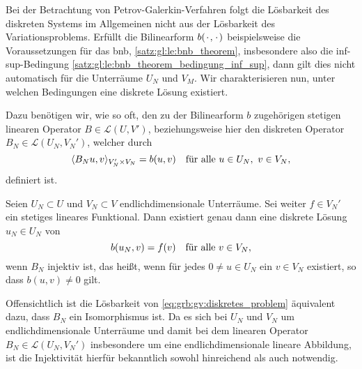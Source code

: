 Bei der Betrachtung von Petrov-Galerkin-Verfahren folgt die Lösbarkeit des diskreten Systems im Allgemeinen nicht aus der Lösbarkeit des Variationsproblems.
Erfüllt die Bilinearform $b(\blank, \blank)$ beispielsweise die Voraussetzungen für das \acl{bnb}, \cref{satz:gl:le:bnb_theorem}, insbesondere also die inf-sup-Bedingung \cref{satz:gl:le:bnb_theorem_bedingung_inf_sup}, dann gilt dies nicht automatisch für die Unterräume $U_{N}$ und $V_{M}$.
Wir charakterisieren nun, unter welchen Bedingungen eine diskrete Lösung existiert.


Dazu benötigen wir, wie so oft, den zu der Bilinearform $b$ zugehörigen stetigen linearen Operator $B \in \mathcal L(U, V')$, beziehungsweise hier den diskreten Operator $B_{N} \in \mathcal L(U_{N}, V_{N}')$, welcher durch
\begin{equation}
    \skp{B_{N} u}{v}{V_{N}' \times V_{N}} = b(u, v) \quad \fa u \in U_{N}, ~v \in V_{N},
\end{equation}
definiert ist.

\begin{Satz}
\label{satz:grb:gv:existenz_eindeutigkeit_der_disrekten_loesung}
    Seien $U_{N} \subset U$ und $V_{N} \subset V$ endlichdimensionale Unterräume.
    Sei weiter $f \in V_{N}'$ ein stetiges lineares Funktional.
    Dann existiert genau dann eine diskrete Lösung $u_{N} \in U_{N}$ von
    \begin{equation}
    \label{eq:grb:gv:diskretes_problem}
        b(u_{N}, v) = f(v) \quad \fa v \in V_{N},
    \end{equation}
    wenn $B_{N}$ injektiv ist, das heißt, wenn für jedes $0 \neq u \in U_{N}$ ein $v \in V_{N}$ existiert, so dass $b(u, v) \neq 0$ gilt.

    \begin{Beweis}
        Offensichtlich ist die Lösbarkeit von \cref{eq:grb:gv:diskretes_problem} äquivalent dazu, dass $B_{N}$ ein Isomorphismus ist.
        Da es sich bei $U_{N}$ und $V_{N}$ um endlichdimensionale Unterräume und damit bei dem linearen Operator $B_{N} \in \mathcal L(U_{N}, V_{N}')$ insbesondere um eine endlichdimensionale lineare Abbildung, ist die Injektivität hierfür bekanntlich sowohl hinreichend als auch notwendig.
    \end{Beweis}
\end{Satz}


